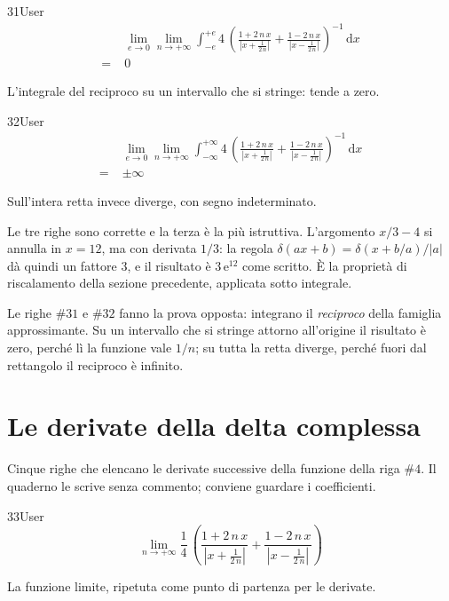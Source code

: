 \begin{espr}{31}{User}{}
\begin{align*}
& \lim_{e \to 0} \lim_{n \to +\infty} \int_{-e}^{+e} 4\, \left(\frac{1 + 2\, n\, x}{\left|x + \frac{1}{2\, n}\right|} + \frac{1 - 2\, n\, x}{\left|x - \frac{1}{2\, n}\right|}\right)^{-1} \,\mathrm{d}x \\
=\;& 0
\end{align*}
\end{espr}
L'integrale del reciproco su un intervallo che si stringe: tende a zero.

\begin{espr}{32}{User}{}
\begin{align*}
& \lim_{e \to 0} \lim_{n \to +\infty} \int_{-\infty}^{+\infty} 4\, \left(\frac{1 + 2\, n\, x}{\left|x + \frac{1}{2\, n}\right|} + \frac{1 - 2\, n\, x}{\left|x - \frac{1}{2\, n}\right|}\right)^{-1} \,\mathrm{d}x \\
=\;& \pm \infty
\end{align*}
\end{espr}
Sull'intera retta invece diverge, con segno indeterminato.


Le tre righe sono corrette e la terza è la più istruttiva. L'argomento $x/3-4$ si annulla in $x=12$, ma con derivata $1/3$: la regola $\delta(ax+b)=\delta\!\left(x+b/a\right)/|a|$ dà quindi un fattore $3$, e il risultato è $3\,\mathrm{e}^{12}$ come scritto. È la proprietà di riscalamento della sezione precedente, applicata sotto integrale.

Le righe $\#31$ e $\#32$ fanno la prova opposta: integrano il \emph{reciproco} della famiglia approssimante. Su un intervallo che si stringe attorno all'origine il risultato è zero, perché lì la funzione vale $1/n$; su tutta la retta diverge, perché fuori dal rettangolo il reciproco è infinito.

\section{Le derivate della delta complessa}

Cinque righe che elencano le derivate successive della funzione della riga $\#4$. Il quaderno le scrive senza commento; conviene guardare i coefficienti.

\begin{espr}{33}{User}{}
\[
\lim_{n \to +\infty} \frac{1}{4}\, \left(\frac{1 + 2\, n\, x}{\left|x + \frac{1}{2\, n}\right|} + \frac{1 - 2\, n\, x}{\left|x - \frac{1}{2\, n}\right|}\right)
\]
\end{espr}
La funzione limite, ripetuta come punto di partenza per le derivate.

